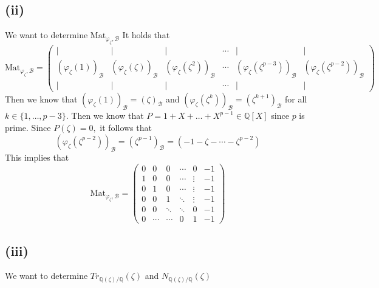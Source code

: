 \documentclass[10pt,a4paper]{article}
\newcommand{\QQ}{\mathbb{Q}}
\newcommand{\Mat}{\mathrm{Mat}}
\begin{document}
	\subsection*{(ii)}
	We want to determine $\Mat_{\varphi_{\zeta},\mathcal{B}}$
	It holds that
	\[\Mat_{\varphi_{\zeta},\mathcal{B}} = \left(\begin{array}{cccccc}
		\mid & \mid & \mid & \cdots & \mid & \mid\\
		(\varphi_{\zeta}(1))_{\mathcal{B}} & (\varphi_{\zeta}(\zeta))_{\mathcal{B}} & (\varphi_{\zeta}(\zeta^2))_{\mathcal{B}} & \cdots & (\varphi_{\zeta}(\zeta^{p-3}))_{\mathcal{B}}& (\varphi_{\zeta}(\zeta^{p-2}))_{\mathcal{B}}\\
		\mid & \mid & \mid & \cdots & \mid & \mid
	\end{array}\right)\]
	Then we know that $(\varphi_{\zeta}(1))_{\mathcal{B}} = (\zeta)_{\mathcal{B}}$ and $(\varphi_{\zeta}(\zeta^k))_{\mathcal{B}} = (\zeta^{k+1})_{\mathcal{B}}$ for all $k\in \{1,\dots, p-3\}.$ Then we know that $P = 1+X+\dots+ X^{p-1}\in \QQ[X]$ since $p$ is prime. Since $P(\zeta) = 0,$ it follows that
	\[(\varphi_{\zeta}(\zeta^{p-2}))_{\mathcal{B}} = (\zeta^{p-1})_{\mathcal{B}} = (-1-\zeta-\cdots - \zeta^{p-2})\]
	This implies that
	\[\Mat_{\varphi_{\zeta},\mathcal{B}} = \begin{pmatrix}
		0 & 0 & 0 & \cdots & 0 & -1\\
		1 & 0 & 0 & \cdots & \vdots & -1\\
		0 & 1 & 0 & \cdots & \vdots & -1\\
		0 & 0 & 1 & \ddots & \vdots &-1\\
		0 & 0 & \ddots & \ddots & 0 & -1\\
		0 & \cdots & \cdots & 0 & 1 & -1
	\end{pmatrix}\]
	\subsection*{(iii)}
	We want to determine $Tr_{\QQ(\zeta)/\QQ}(\zeta)$ and $N_{\QQ(\zeta)/\QQ}(\zeta)$
	
	\pagebreak
	
\end{document}
